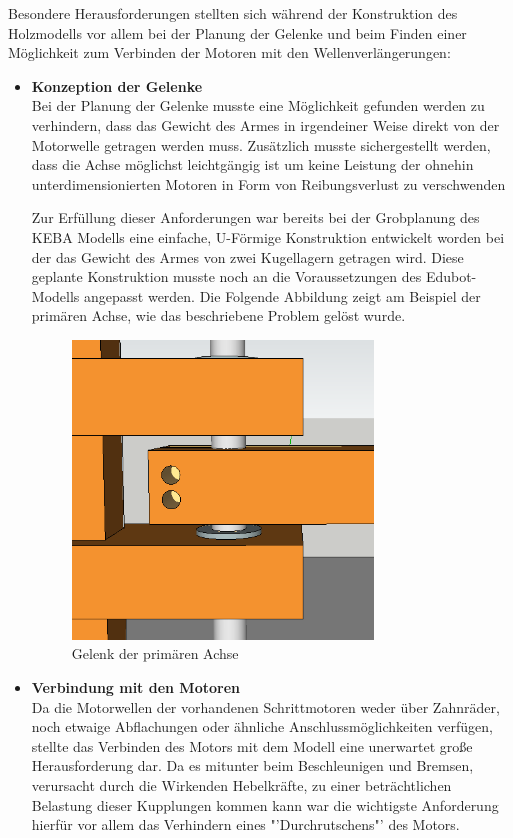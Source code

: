 Besondere Herausforderungen stellten sich während der Konstruktion des Holzmodells vor allem bei der Planung der Gelenke und beim Finden einer Möglichkeit zum Verbinden der Motoren mit den Wellenverlängerungen:
\begin{itemize}
\item \textbf{Konzeption der Gelenke}\\
Bei der Planung der Gelenke musste eine Möglichkeit gefunden werden zu verhindern, dass das Gewicht des Armes in irgendeiner Weise direkt von der Motorwelle getragen werden muss. Zusätzlich musste sichergestellt werden, dass die Achse möglichst leichtgängig ist um keine Leistung der ohnehin unterdimensionierten Motoren in Form von Reibungsverlust zu verschwenden

Zur Erfüllung dieser Anforderungen war bereits bei der Grobplanung des KEBA Modells eine einfache, U-Förmige Konstruktion entwickelt worden bei der das Gewicht des Armes von zwei Kugellagern getragen wird. Diese geplante Konstruktion musste noch an die Voraussetzungen des Edubot-Modells angepasst werden. Die Folgende Abbildung zeigt am Beispiel der primären Achse, wie das beschriebene Problem gelöst wurde.

\begin{figure}[H]
  \centering
  \begin{minipage}[t]{8 cm}
  	\centering
  	\includegraphics[width=8cm]{images/primary_gelenk} 
    \caption{Gelenk der primären Achse}
  \end{minipage}
\end{figure}

\item \textbf{Verbindung mit den Motoren}\\
Da die Motorwellen der vorhandenen Schrittmotoren weder über Zahnräder, noch etwaige Abflachungen oder ähnliche Anschlussmöglichkeiten verfügen, stellte das Verbinden des Motors mit dem Modell eine unerwartet große Herausforderung dar. Da es mitunter beim Beschleunigen und Bremsen, verursacht durch die Wirkenden Hebelkräfte, zu einer beträchtlichen Belastung dieser Kupplungen kommen kann war die wichtigste Anforderung hierfür vor allem das Verhindern eines "'Durchrutschens"' des Motors. 


\end{itemize}
